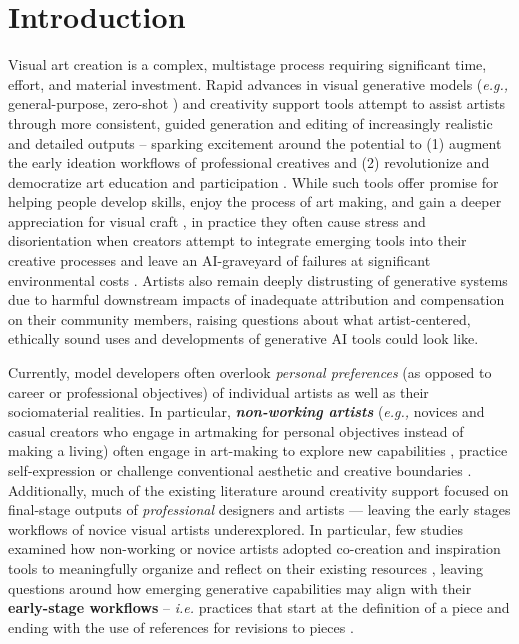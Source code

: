 \section{Introduction}
Visual art creation is a complex, multistage process requiring significant time, effort, and material investment. 
Rapid advances in visual generative models (\textit{e.g.,} general-purpose, zero-shot \cite{paradox, lgtm}) and creativity support tools attempt to assist artists through more consistent, guided generation and editing \cite{zhang2023text} of increasingly realistic and detailed outputs \cite{podell2024sdxl} -- sparking excitement around the potential to (1) augment the early ideation workflows of professional creatives \cite{wang2025aideation, GenQuery, architectural, art_implications, poet, lamuse} and (2) revolutionize and democratize art education and participation \cite{democratize, edu}. 
While such tools offer promise for helping people develop skills, enjoy the process of art making, and gain a deeper appreciation for visual craft \cite{jackson}, in practice they often cause stress and disorientation \cite{kawakami2024impact, lgtm} when creators attempt to integrate emerging tools into their creative processes \cite{unstraighten} and leave an AI-graveyard of failures \cite{graveyard} at significant environmental costs \cite{hungry}. Artists also remain deeply distrusting of generative systems due to harmful downstream impacts of inadequate attribution and compensation on their community members, raising questions about what artist-centered, ethically sound uses and developments of generative AI tools could look like.

Currently, model developers often overlook \textit{personal preferences} (as opposed to career or professional objectives) of individual artists as well as their sociomaterial realities. In particular, \textit{\textbf{non-working artists}} (\textit{e.g.,} novices and casual creators who engage in artmaking for personal objectives instead of making a living) often engage in art-making to explore new capabilities \cite{clinical, personal}, practice self-expression \cite{real_benefits} or challenge conventional aesthetic and creative boundaries \cite{decline_novelty, art_implications}. Additionally, much of the existing literature around creativity support focused on final-stage outputs of \textit{professional} designers and artists \cite{design_professionals, shi2023understanding} --- leaving the early stages workflows of novice visual artists underexplored.
In particular, few studies examined how non-working or novice artists \cite{hu2025designing} adopted co-creation and inspiration tools to meaningfully organize and reflect on their existing resources \cite{lamuse}, leaving questions around how emerging generative capabilities may align with their \textbf{early-stage workflows} --  \textit{i.e.} practices that start at the definition of a piece and ending with the use of references for revisions to pieces  \cite{botella2018stages}.


